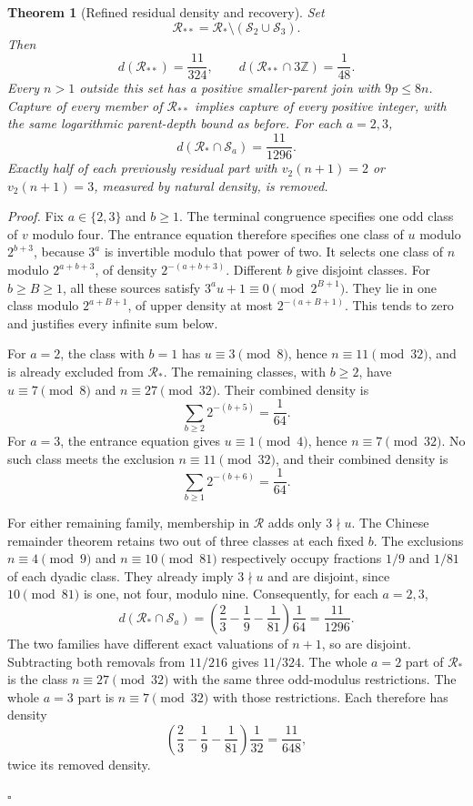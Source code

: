 \documentclass[11pt,letterpaper]{article}
\newcommand{\Z}{\mathbb{Z}}
\newtheorem{theorem}{Theorem}
\newenvironment{proof}{\noindent\textit{Proof.}}{\hfill\(\square\)}
\begin{document}
\begin{theorem}[Refined residual density and recovery]
Set
\[
\mathcal R_{**}=\mathcal R_*\setminus(\mathcal S_2\cup\mathcal S_3).
\]
Then
\[
d(\mathcal R_{**})=\frac{11}{324},\qquad
d(\mathcal R_{**}\cap3\Z)=\frac1{48}.
\]
Every \(n>1\) outside this set has a positive smaller-parent join with
\(9p\le8n\). Capture of every member of \(\mathcal R_{**}\) implies
capture of every positive integer, with the same logarithmic parent-depth
bound as before. For each \(a=2,3\),
\[
d(\mathcal R_*\cap\mathcal S_a)=\frac{11}{1296}.
\]
Exactly half of each previously residual part with \(v_2(n+1)=2\) or
\(v_2(n+1)=3\), measured by natural density, is removed.
\end{theorem}
\begin{proof}
Fix \(a\in\{2,3\}\) and \(b\ge1\).
The terminal congruence specifies one odd class of \(v\) modulo four.
The entrance equation therefore specifies one class of \(u\) modulo
\(2^{b+3}\), because \(3^a\) is invertible modulo that power of two.
It selects one class of \(n\) modulo \(2^{a+b+3}\), of density
\(2^{-(a+b+3)}\). Different \(b\) give disjoint classes.
For \(b\ge B\ge1\), all these sources satisfy
\(3^a u+1\equiv0\pmod{2^{B+1}}\).
They lie in one class modulo \(2^{a+B+1}\), of upper density at most
\(2^{-(a+B+1)}\). This tends to zero and justifies every infinite sum below.

For \(a=2\), the class with \(b=1\) has \(u\equiv3\pmod8\), hence
\(n\equiv11\pmod{32}\), and is already excluded from \(\mathcal R_*\).
The remaining classes, with \(b\ge2\), have \(u\equiv7\pmod8\)
and \(n\equiv27\pmod{32}\). Their combined density is
\[
\sum_{b\ge2}2^{-(b+5)}=\frac1{64}.
\]
For \(a=3\), the entrance equation gives \(u\equiv1\pmod4\),
hence \(n\equiv7\pmod{32}\). No such class meets the exclusion
\(n\equiv11\pmod{32}\), and their combined density is
\[
\sum_{b\ge1}2^{-(b+6)}=\frac1{64}.
\]

For either remaining family, membership in \(\mathcal R\) adds only
\(3\nmid u\). The Chinese remainder theorem retains two out of three
classes at each fixed \(b\). The exclusions \(n\equiv4\pmod9\)
and \(n\equiv10\pmod{81}\) respectively occupy fractions \(1/9\)
and \(1/81\) of each dyadic class. They already imply \(3\nmid u\)
and are disjoint, since \(10\pmod{81}\) is one, not four, modulo nine.
Consequently, for each \(a=2,3\),
\[
d(\mathcal R_*\cap\mathcal S_a)
 =\left(\frac23-\frac19-\frac1{81}\right)\frac1{64}
 =\frac{11}{1296}.
\]
The two families have different exact valuations of \(n+1\), so are
disjoint. Subtracting both removals from \(11/216\) gives \(11/324\).
The whole \(a=2\) part of \(\mathcal R_*\) is the class
\(n\equiv27\pmod{32}\) with the same three odd-modulus restrictions.
The whole \(a=3\) part is \(n\equiv7\pmod{32}\) with those restrictions.
Each therefore has density
\[
\left(\frac23-\frac19-\frac1{81}\right)\frac1{32}
=\frac{11}{648},
\]
twice its removed density.


\end{proof}
\end{document}
